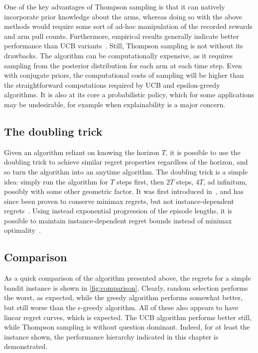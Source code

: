 One of the key advantages of Thompson sampling is that it can natively incorporate prior knowledge about the arms, whereas doing so with the above methods would require some sort of ad-hoc manipulation of the recorded rewards and arm pull counts.
Furthermore, empirical results generally indicate better performance than UCB variants~\autocite{kaufmann2012}.
Still, Thompson sampling is not without its drawbacks.
The algorithm can be computationally expensive, as it requires sampling from the posterior distribution for each arm at each time step.
Even with conjugate priors, the computational costs of sampling will be higher than the straightforward computations required by UCB and epsilon-greedy algorithms.
It is also at its core a probabilistic policy, which for some applications may be undesirable, for example when explainability is a major concern.

\subsection{The doubling trick}
Given an algorithm reliant on knowing the horizon $T$, it is possible to use the doubling trick to achieve similar regret properties regardless of the horizon, and so turn the algorithm into an anytime algorithm.
The doubling trick is a simple idea: simply run the algorithm for $T$ steps first, then $2T$ steps, $4T$, ad infinitum, possibly with some other geometric factor.
It was first introduced in~\autocite{auer1995}, and has since been proven to conserve minimax regrets, but not instance-dependent regrets~\autocite{besson2018}.
Using instead exponential progression of the episode lengths, it is possible to maintain instance-dependent regret bounds instead of minimax optimality~\autocite{besson2018}.

\subsection{Comparison}
\label{sec:comparison}
As a quick comparison of the algorithm presented above, the regrets for a simple bandit instance is shown in \cref{fig:comparison}.
Clearly, random selection performs the worst, as expected, while the greedy algorithm performs somewhat better, but still worse than the $\epsilon$-greedy algorithm.
All of these also appears to have linear regret curves, which is expected.
The UCB algorithm performs better still, while Thompson sampling is without question dominant.
Indeed, for at least the instance shown, the performance hierarchy indicated in this chapter is demonstrated.

